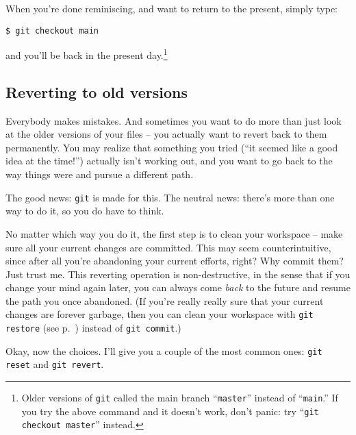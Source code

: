 When you're done reminiscing, and want to return to the present, simply type:

\begin{Verbatim}[fontsize=\small,samepage=true,frame=none]
$ git checkout main
\end{Verbatim}

and you'll be back in the present day.\footnote{Older versions of \texttt{git}
called the main branch ``\texttt{master}'' instead of ``\texttt{main}.'' If you
try the above command and it doesn't work, don't panic: try ``\texttt{git
checkout master}'' instead.}

\subsection{Reverting to old versions}

Everybody makes mistakes. And sometimes you want to do more than just look at
the older versions of your files -- you actually want to revert back to them
permanently. You may realize that something you tried (``it seemed like a good
idea at the time!'') actually isn't working out, and you want to go back to the
way things were and pursue a different path.

The good news: \texttt{git} is made for this. The neutral news: there's more
than one way to do it, so you do have to think.


No matter which way you do it, the first step is to clean your workspace --
make sure all your current changes are committed. This may seem
counterintuitive, since after all you're abandoning your current efforts,
right? Why commit them? Just trust me. This reverting operation is
non-destructive, in the sense that if you change your mind again later, you can
always come \textit{back} to the future and resume the path you once abandoned.
(If you're really really sure that your current changes are forever garbage,
then you can clean your workspace with \texttt{git restore} (see
p.~\pageref{gitRestore}) instead of \texttt{git commit}.)

\medskip

Okay, now the choices. I'll give you a couple of the most common ones:
\texttt{git reset} and \texttt{git revert}.

